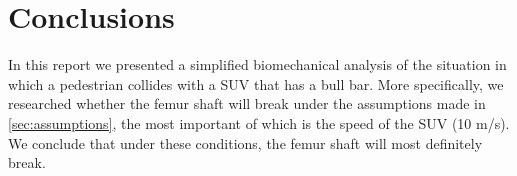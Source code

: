 \section{Conclusions}
In this report we presented a simplified biomechanical analysis of the situation
in which a pedestrian collides with a SUV that has a bull bar. More
specifically, we researched whether the femur shaft will break under the
assumptions made in \autoref{sec:assumptions}, the most important of which is
the speed of the SUV (10 m/s). We conclude that under these conditions, the
femur shaft will most definitely break.
